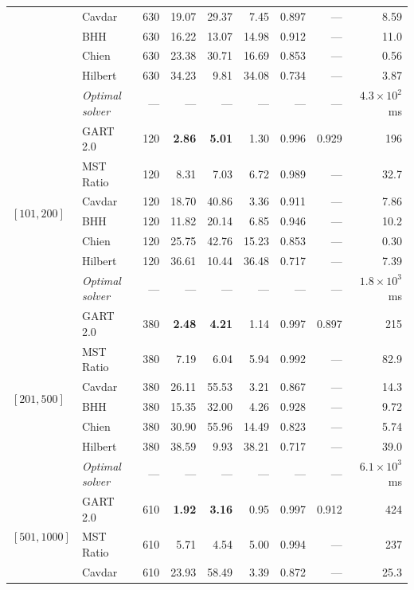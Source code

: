 \begin{table}[!ht]
{\begin{tabular}{@{}ll rrrrrrr@{}}
    & Cavdar & 630 & 19.07 & 29.37 & 7.45 & 0.897 & --- & 8.59 \\
    & BHH & 630 & 16.22 & 13.07 & 14.98 & 0.912 & --- & 11.0 \\
    & Chien & 630 & 23.38 & 30.71 & 16.69 & 0.853 & --- & 0.56 \\
    & Hilbert & 630 & 34.23 & 9.81 & 34.08 & 0.734 & --- & 3.87 \\
    & \textit{Optimal solver} & --- & --- & --- & --- & --- & --- & $4.3\times 10^{2}$~ms \\
    \midrule
    \multirow{7}{*}{$[101,200]$}
    & GART 2.0 & 120 & \textbf{2.86} & \textbf{5.01} & 1.30 & 0.996 & 0.929 & 196 \\
    & MST Ratio & 120 & 8.31 & 7.03 & 6.72 & 0.989 & --- & 32.7 \\
    & Cavdar & 120 & 18.70 & 40.86 & 3.36 & 0.911 & --- & 7.86 \\
    & BHH & 120 & 11.82 & 20.14 & 6.85 & 0.946 & --- & 10.2 \\
    & Chien & 120 & 25.75 & 42.76 & 15.23 & 0.853 & --- & 0.30 \\
    & Hilbert & 120 & 36.61 & 10.44 & 36.48 & 0.717 & --- & 7.39 \\
    & \textit{Optimal solver} & --- & --- & --- & --- & --- & --- & $1.8\times 10^{3}$~ms \\
    \midrule
    \multirow{7}{*}{$[201,500]$}
    & GART 2.0 & 380 & \textbf{2.48} & \textbf{4.21} & 1.14 & 0.997 & 0.897 & 215 \\
    & MST Ratio & 380 & 7.19 & 6.04 & 5.94 & 0.992 & --- & 82.9 \\
    & Cavdar & 380 & 26.11 & 55.53 & 3.21 & 0.867 & --- & 14.3 \\
    & BHH & 380 & 15.35 & 32.00 & 4.26 & 0.928 & --- & 9.72 \\
    & Chien & 380 & 30.90 & 55.96 & 14.49 & 0.823 & --- & 5.74 \\
    & Hilbert & 380 & 38.59 & 9.93 & 38.21 & 0.717 & --- & 39.0 \\
    & \textit{Optimal solver} & --- & --- & --- & --- & --- & --- & $6.1\times 10^{3}$~ms \\
    \midrule
    \multirow{7}{*}{$[501,1000]$}
    & GART 2.0 & 610 & \textbf{1.92} & \textbf{3.16} & 0.95 & 0.997 & 0.912 & 424 \\
    & MST Ratio & 610 & 5.71 & 4.54 & 5.00 & 0.994 & --- & 237 \\
    & Cavdar & 610 & 23.93 & 58.49 & 3.39 & 0.872 & --- & 25.3 \\

\end{tabular}}
\end{table}

